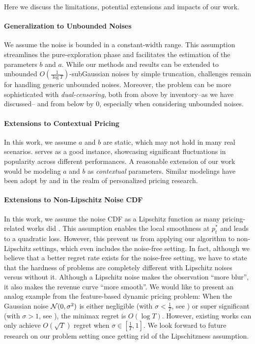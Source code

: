Here we discuss the limitations, potential extensions and impacts of our work.

\paragraph{Generalization to Unbounded Noises}
We assume the noise is bounded in a constant-width range. This assumption streamlines the pure-exploration phase and facilitates the estimation of the parameters $b$ and $a$. While our methods and results can be extended to unbounded $O(\frac1{\log T})$-subGaussian noises by simple truncation, challenges remain for handling generic unbounded noises. Moreover, the problem can be more sophisticated with \emph{dual-censoring}, both from above by inventory--as we have discussed-- and from below by $0$, especially when considering unbounded noises.

\paragraph{Extensions to Contextual Pricing}
In this work, we assume $a$ and $b$ are static, which may not hold in many real scenarios.  serves as a good instance, showcasing significant fluctuations in popularity across different performances. A reasonable extension of our work would be modeling $a$ and $b$ as \emph{contextual} parameters. Similar modelings have been adopt by \citet{wang2021dynamic} and \citet{ban2021personalized} in the realm of personalized pricing research.

\paragraph{Extensions to Non-Lipschitz Noise CDF}
In this work, we assume the noise CDF as a Lipschitz function as many pricing-related works did \citep{fan2021policy, tullii2024improved}. This assumption enables the local smoothness at $p_t^*$ and leads to a quadratic loss. However, this prevent us from applying our algorithm to non-Lipschitz settings, which even includes the noise-free setting. In fact, although we believe that a better regret rate exists for the noise-free setting, we have to state that the hardness of problems are completely different with Lipschitz noises versus without it. Although a Lipschitz noise makes the observation ``more blur'', it also makes the revenue curve ``more smooth''. We would like to present an analog example from the feature-based dynamic pricing problem: When the Gaussian noise $\mathcal{N}(0, \sigma^2)$ is either negligible (with $\sigma<\frac1T$, see \citet{cohen2020feature_journal}) or super significant (with $\sigma>1$, see \citet{xu2021logarithmic}), the minimax regret is $O(\log T)$. However, existing works can only achieve $O(\sqrt{T})$ regret when $\sigma\in[\frac1T, 1]$. We look forward to future research on our problem setting once getting rid of the Lipschitzness assumption.

